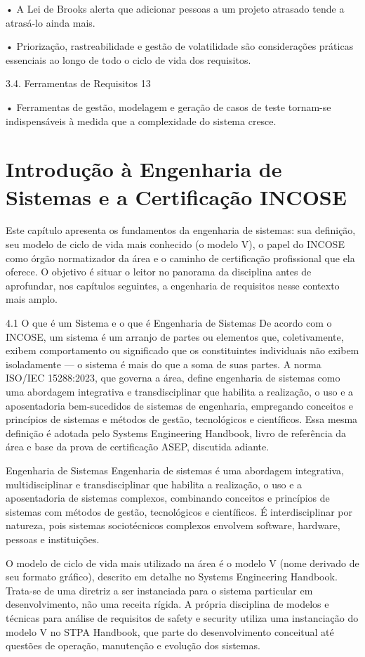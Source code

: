 • A Lei de Brooks alerta que adicionar pessoas a um projeto atrasado tende a atrasá-lo ainda mais.

• Priorização, rastreabilidade e gestão de volatilidade são considerações práticas essenciais ao longo de todo o ciclo de vida dos requisitos.

3.4. Ferramentas de Requisitos 13

• Ferramentas de gestão, modelagem e geração de casos de teste tornam-se indispensáveis à medida que a complexidade do sistema cresce.

\chapter{Introdução à Engenharia de Sistemas e a Certificação INCOSE}

Este capítulo apresenta os fundamentos da engenharia de sistemas: sua definição, seu modelo de ciclo de vida mais conhecido (o modelo V), o papel do INCOSE como órgão normatizador da área e o caminho de certificação profissional que ela oferece. O objetivo é situar o leitor no panorama da disciplina antes de aprofundar, nos capítulos seguintes, a engenharia de requisitos nesse contexto mais amplo.

4.1 O que é um Sistema e o que é Engenharia de Sistemas De acordo com o INCOSE, um sistema é um arranjo de partes ou elementos que, coletivamente, exibem comportamento ou significado que os constituintes individuais não exibem isoladamente — o sistema é mais do que a soma de suas partes. A norma ISO/IEC 15288:2023, que governa a área, define engenharia de sistemas como uma abordagem integrativa e transdisciplinar que habilita a realização, o uso e a aposentadoria bem-sucedidos de sistemas de engenharia, empregando conceitos e princípios de sistemas e métodos de gestão, tecnológicos e científicos. Essa mesma definição é adotada pelo Systems Engineering Handbook, livro de referência da área e base da prova de certificação ASEP, discutida adiante.

Engenharia de Sistemas Engenharia de sistemas é uma abordagem integrativa, multidisciplinar e transdisciplinar que habilita a realização, o uso e a aposentadoria de sistemas complexos, combinando conceitos e princípios de sistemas com métodos de gestão, tecnológicos e científicos. É interdisciplinar por natureza, pois sistemas sociotécnicos complexos envolvem software, hardware, pessoas e instituições.

O modelo de ciclo de vida mais utilizado na área é o modelo V (nome derivado de seu formato gráfico), descrito em detalhe no Systems Engineering Handbook. Trata-se de uma diretriz a ser instanciada para o sistema particular em desenvolvimento, não uma receita rígida. A própria disciplina de modelos e técnicas para análise de requisitos de safety e security utiliza uma instanciação do modelo V no STPA Handbook, que parte do desenvolvimento conceitual até questões de operação, manutenção e evolução dos sistemas.

